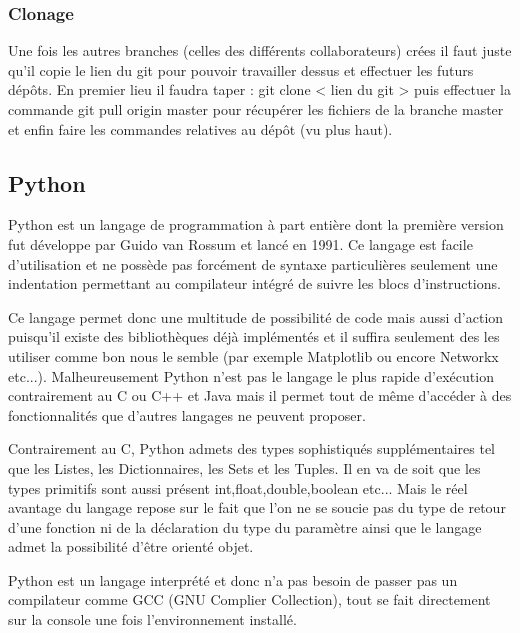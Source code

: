 \documentclass[a4paper, 12pt, twoside]{article}
\begin{document}
\subsubsection{Clonage}
Une fois les autres branches (celles des différents collaborateurs) crées il faut juste qu'il copie le lien du git pour pouvoir travailler dessus et effectuer les futurs dépôts. En premier lieu il faudra taper :  git clone < lien du git >  puis effectuer la commande git pull origin master  pour récupérer les fichiers de la branche master et enfin faire les commandes relatives au dépôt (vu plus haut).

\subsection{Python}
Python est un langage de programmation à part entière dont la première version fut développe par \textsf{Guido van Rossum} et lancé en 1991. Ce langage est facile d'utilisation et ne possède pas forcément de syntaxe particulières seulement une indentation permettant au compilateur intégré de suivre les blocs d'instructions. \newline

Ce langage permet donc une multitude de possibilité de code mais aussi d'action puisqu'il existe des bibliothèques déjà implémentés et il suffira seulement des les utiliser comme bon nous le semble (par exemple Matplotlib ou encore Networkx etc...). Malheureusement Python n'est pas le langage le plus rapide d'exécution contrairement au C ou C++ et Java mais il permet tout de même d'accéder à des fonctionnalités que d'autres langages ne peuvent proposer. \newline

Contrairement au C, Python admets des types sophistiqués supplémentaires tel que les \textsf{Listes}, les \textsf{Dictionnaires}, les \textsf{Sets} et les \textsf{Tuples}. Il en va de soit que les types primitifs sont aussi présent \textsf{int,float,double,boolean etc..}. Mais le réel avantage du langage repose sur le fait que l'on ne se soucie pas du type de retour d'une fonction ni de la déclaration du type du paramètre ainsi que le langage admet la possibilité d'être orienté objet. \newline

Python est un langage interprété et donc n'a pas besoin de passer pas un compilateur comme GCC (GNU Complier Collection), tout se fait directement sur la console une fois l'environnement installé. \newline
\end{document}
